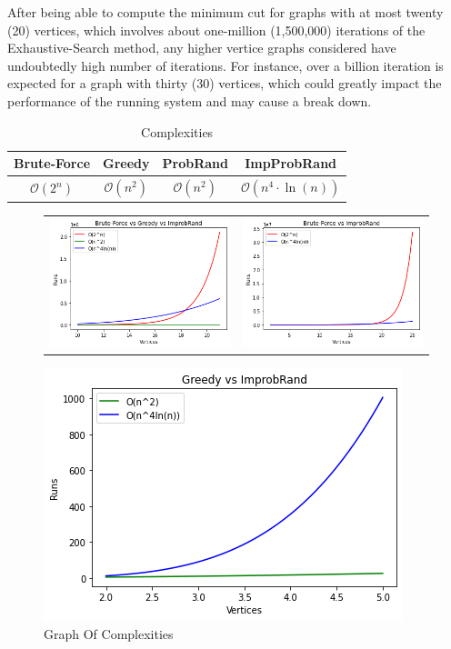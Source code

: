 \documentclass[longpaper, english, final, times]{revdetua}
\begin{document}
			After being able to compute the minimum cut for graphs with at most twenty (20) vertices, which involves about one-million (1,500,000) iterations of the Exhaustive-Search method, any higher vertice graphs considered have undoubtedly high number of iterations. For instance, over a billion iteration is expected for a graph with thirty (30) vertices, which could greatly impact the performance of the running system and may cause a break down.
			\begin{table}[h]
				\caption{Complexities}
				\label{table:computationalComplexities}
				{\renewcommand{\arraystretch}{2}
					\begin{tabular}{|c|c|c|c|}
						\hline
						Brute-Force & Greedy & ProbRand & ImpProbRand\\
						\hline
						$\mathcal{O}\left(2^n\right)$&
						$\mathcal{O}(n^2)$&$\mathcal{O}(n^2)$&$\mathcal{O}\left(n^4\cdot \ln(n)\right)$\\
						\hline
					\end{tabular}
				}
			\end{table}
			\begin{figure}[h]
				\begin{tabular}{cc}
					\includegraphics[width=0.5\linewidth]{imgs/complexitiesallalgs.png} &   \includegraphics[width=0.5\linewidth]{imgs/complexitiesbruteforceimpprobrand.png} \\
				\end{tabular}
				
				\begin{center}
					\includegraphics[width=0.5\linewidth]{imgs/complexitiesgreedyimpprobrand.png}
				\end{center}
				\caption{Graph Of Complexities}
				\label{figure:complexities}
			\end{figure}
		
\end{document}
